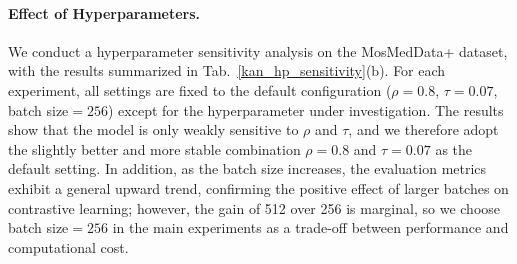\documentclass{article} %
\begin{document}
\begin{table}[htbp]
\caption{Ablation of KAN and hyperparameters on MosMedData+ datasets.}
\label{kan_hp_sensitivity}
\begin{center}
\end{center}
\end{table}

\paragraph{Effect of Hyperparameters.}

We conduct a hyperparameter sensitivity analysis on the MosMedData+ dataset, with the results summarized in Tab.~\ref{kan_hp_sensitivity}(b). For each experiment, all settings are fixed to the default configuration ($\rho{=}0.8$, $\tau{=}0.07$, batch size${=}256$) except for the hyperparameter under investigation. The results show that the model is only weakly sensitive to $\rho$ and $\tau$, and we therefore adopt the slightly better and more stable combination $\rho{=}0.8$ and $\tau{=}0.07$ as the default setting. In addition, as the batch size increases, the evaluation metrics exhibit a general upward trend, confirming the positive effect of larger batches on contrastive learning; however, the gain of 512 over 256 is marginal, so we choose batch size${=}256$ in the main experiments as a trade-off between performance and computational cost.
\end{document}
